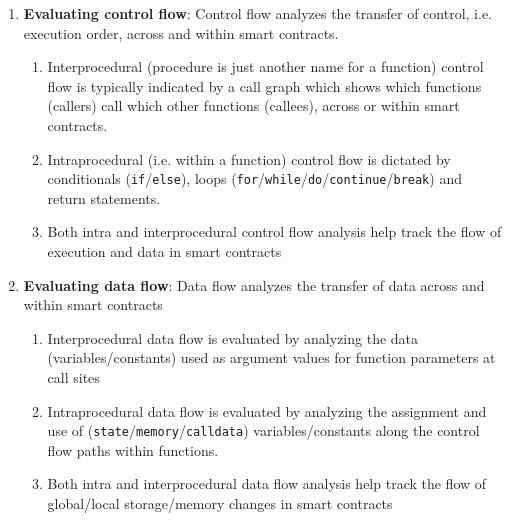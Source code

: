 \begin{enumerate}
\item\textbf{Evaluating control flow}: Control flow analyzes the transfer of control, i.e. execution order, across and within smart contracts.
	\begin{enumerate}
	\item Interprocedural (procedure is just another name for a function) control flow is typically indicated by a call graph which shows which functions (callers) call which other functions (callees), across or within smart contracts.
	\item Intraprocedural (i.e. within a function) control flow is dictated by conditionals (\verb|if|/\verb|else|), loops (\verb|for|/\verb|while|/\verb|do|/\verb|continue|/\verb|break|) and return statements.
	\item Both intra and interprocedural control flow analysis help track the flow of execution and data in smart contracts
	\end{enumerate}

\item\textbf{Evaluating data flow}: Data flow analyzes the transfer of data across and within smart contracts
	\begin{enumerate}
	\item Interprocedural data flow is evaluated by analyzing the data (variables/constants) used as argument values for function parameters at call sites
	\item Intraprocedural data flow is evaluated by analyzing the assignment and use of (\verb|state|/\verb|memory|/\verb|calldata|) variables/constants along the control flow paths within functions.
	\item Both intra and interprocedural data flow analysis help track the flow of global/local storage/memory changes in smart contracts
	\end{enumerate}


\end{enumerate}
